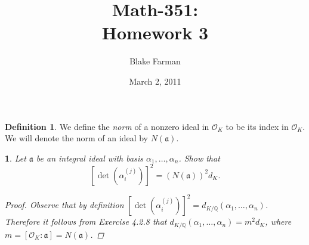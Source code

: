\documentclass[10pt]{amsart}
\author{Blake Farman}
\title{Math-351:\\Homework 3}
\date{March 2, 2011}
\begin{document}
\maketitle

\newcommand{\Z}{\mathbb{Z}}
\newcommand{\R}{\mathbb{R}}
\newcommand{\Q}{\mathbb{Q}}
\newcommand{\C}{\mathbb{C}}

\renewcommand{\qedsymbol}{\(\blacksquare\)}
\newcommand{\znz}[1]{\Z / #1\Z}
\newcommand{\mznz}[1]{(\Z / #1\Z)^*}

\renewcommand{\phi}{\varphi}
\newenvironment{alphaenum}{
  \begin{enumerate}
    \renewcommand{\theenumi}{(\alph{enumi})}
    \renewcommand{\labelenumi}{\theenumi}
  }
  {\end{enumerate}}

\newcommand{\quadeq}[3]{\frac{-(#2) \pm \sqrt{(#2)^2 - 4(#1)(#3)}}{2(#3)}}
\newcommand{\F}{\mathbb{F}}
\newcommand{\tor}[1]{\operatorname{Tor}(#1)}
\newcommand{\real}[1]{\operatorname{Re}(#1)}
\newcommand{\imag}[1]{\operatorname{Im}(#1)}

\newcommand{\A}{\mathfrak{a}}
\newcommand{\N}[1]{\mathit{N}(#1)}
\newcommand{\OO}{\mathcal{O}}

\newtheorem{thm}{}

\theoremstyle{definition}
\newtheorem{defn}{Definition}

\begin{defn}
  We define the {\it norm} of a nonzero ideal in $\OO_K$ to be its index in $\OO_K$.
  We will denote the norm of an ideal by $\N{\A}$.

\end{defn}

\begin{thm}
  \label{Ex1}
  Let $\mathfrak{a}$ be an integral ideal with basis $\alpha_1, \ldots, \alpha_n$.
  Show that $$[\det(\alpha_i^{(j)})]^2 = (\N\A)^2d_K.$$
  \begin{proof}
    Observe that by definition $[\det(\alpha_i^{(j)})]^2 = d_{K/\Q}(\alpha_1, \ldots, \alpha_n)$.
    Therefore it follows from Exercise 4.2.8 that $d_{K/\Q}(\alpha_1,\ldots,\alpha_n) = m^2d_K$, where $m = [\OO_K:\A] = \N{\A}$.
  \end{proof}
\end{thm}
\end{document}

